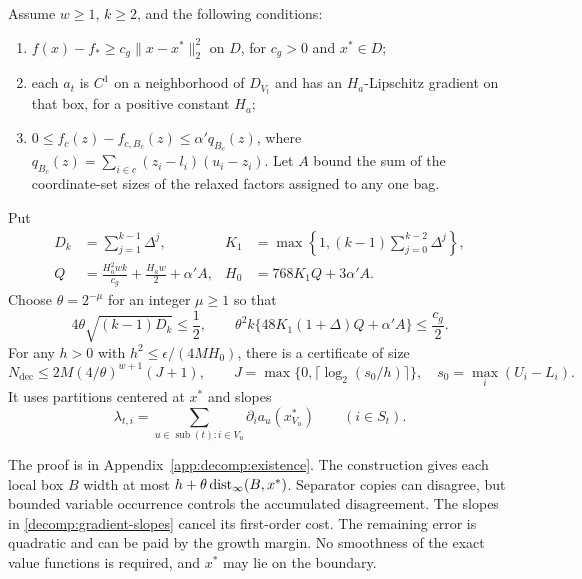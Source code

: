 \begin{theorem}\label{decomp:small-certificate}
Assume $w\ge1$, $k\ge2$, and the following conditions:
\begin{enumerate}
\item $f(x)-f_*\ge c_g\|x-x^*\|_2^2$ on $D$, for $c_g>0$ and $x^*\in D$;
\item each $a_t$ is $C^1$ on a neighborhood of $D_{V_t}$ and has an
      $H_a$-Lipschitz gradient on that box, for a positive constant $H_a$;
\item $0\le f_c(z)-f_{c,B_c}(z)\le\alpha' q_{B_c}(z)$, where
      $q_{B_c}(z)=\sum_{i\in c}(z_i-l_i)(u_i-z_i)$.
      Let $A$ bound the sum of the coordinate-set sizes of the relaxed
      factors assigned to any one bag.
\end{enumerate}
Put
\begin{align*}
 D_k&=\sum_{j=1}^{k-1}\Delta^j,&
 K_1&=\max\left\{1,(k-1)\sum_{j=0}^{k-2}\Delta^j\right\},\\
 Q&=\frac{H_a^2wk}{c_g}+\frac{H_aw}{2}+\alpha'A,&
 H_0&=768K_1Q+3\alpha'A.
\end{align*}
Choose $\theta=2^{-\mu}$ for an integer $\mu\ge1$ so that
\begin{equation}\label{decomp:theta-conditions}
 4\theta\sqrt{(k-1)D_k}\le\frac12,
 \qquad
 \theta^2k\{48K_1(1+\Delta)Q+\alpha'A\}\le\frac{c_g}{2}.
\end{equation}
For any $h>0$ with $h^2\le\epsilon/(4MH_0)$, there is a certificate of size
\begin{equation}\label{decomp:size-bound}
 N_{\mathrm{dec}}\le
 2M(4/\theta)^{w+1}(J+1),\qquad
 J=\max\{0,\lceil\log_2(s_0/h)\rceil\},
 \quad s_0=\max_i(U_i-L_i).
\end{equation}
It uses partitions centered at $x^*$ and slopes
\begin{equation}\label{decomp:gradient-slopes}
 \lambda_{t,i}=
 \sum_{u\in\operatorname{sub}(t):i\in V_u}
              \partial_i a_u(x^*_{V_u})\qquad(i\in S_t).
\end{equation}
\end{theorem}

The proof is in Appendix~\ref{app:decomp:existence}. The construction gives
each local box $B$ width at most $h+\theta\operatorname{dist}_\infty(B,x^*)$.
Separator copies can disagree, but bounded variable occurrence controls
the accumulated disagreement. The slopes in
\eqref{decomp:gradient-slopes} cancel its first-order cost. The remaining
error is quadratic and can be paid by the growth margin. No smoothness of
the exact value functions is required, and $x^*$ may lie on the boundary.

